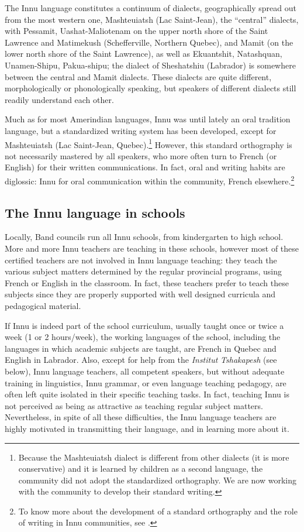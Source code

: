 The Innu language constitutes a continuum of dialects, geographically spread out from the most western one, Mashteuiatsh (Lac Saint-Jean), the ``central'' dialects, with Pessamit, Uashat-Maliotenam on the upper north shore of the Saint Lawrence and Matimekush (Schefferville, Northern Quebec), and Mamit (on the lower north shore of the Saint Lawrence), as well as Ekuantshit, Natashquan, Unamen-Shipu, Pakua-shipu; the dialect of Sheshatshiu (Labrador) is somewhere between the central and Mamit dialects. These dialects are quite different, morphologically or phonologically speaking, but speakers of different dialects still readily understand each other. 

Much as for most Amerindian languages, Innu was until lately an oral tradition language, but a standardized writing system has been developed, except for Mashteuiatsh (Lac Saint-Jean, Quebec).\footnote{Because
 the Mashteuiatsh dialect is different from other dialects (it is more conservative) and it is learned by children as a second language, the community did not adopt the standardized orthography. We are now working with the community to develop their standard writing.
}
However, this standard orthography is not necessarily mastered by all speakers, who more often turn to French (or English) for their written communications. In fact, oral and writing habits are diglossic: Innu for oral communication within the community, French elsewhere.\footnote{To
 know more about the development of a standard orthography and the role of writing in Innu communities, see \citet{Baraby2000,Baraby2002,Baraby2011b}.
}

\subsection{The Innu language in schools}
Locally, Band councils run all Innu schools, from kindergarten to high school. More and more Innu teachers are teaching in these schools, however most of these certified teachers are not involved in Innu language teaching: they teach the various subject matters determined by the regular provincial programs, using French or English in the classroom. In fact, these teachers prefer to teach these subjects since they are properly supported with well designed curricula and pedagogical material.

If Innu is indeed part of the school curriculum, usually taught once or twice a week (1 or 2 hours/week), the working languages of the school, including the languages in which academic subjects are taught, are French in Quebec and English in Labrador. Also, except for help from the \textit{Institut }\textit{Tshakapesh} (see below), Innu language teachers, all competent speakers, but without adequate training in linguistics, Innu grammar, or even language teaching pedagogy, are often left quite isolated in their specific teaching tasks. In fact, teaching Innu is not perceived as being as attractive as teaching regular subject matters. Nevertheless, in spite of all these difficulties, the Innu language teachers are highly motivated in transmitting their language, and in learning more about it.
 
